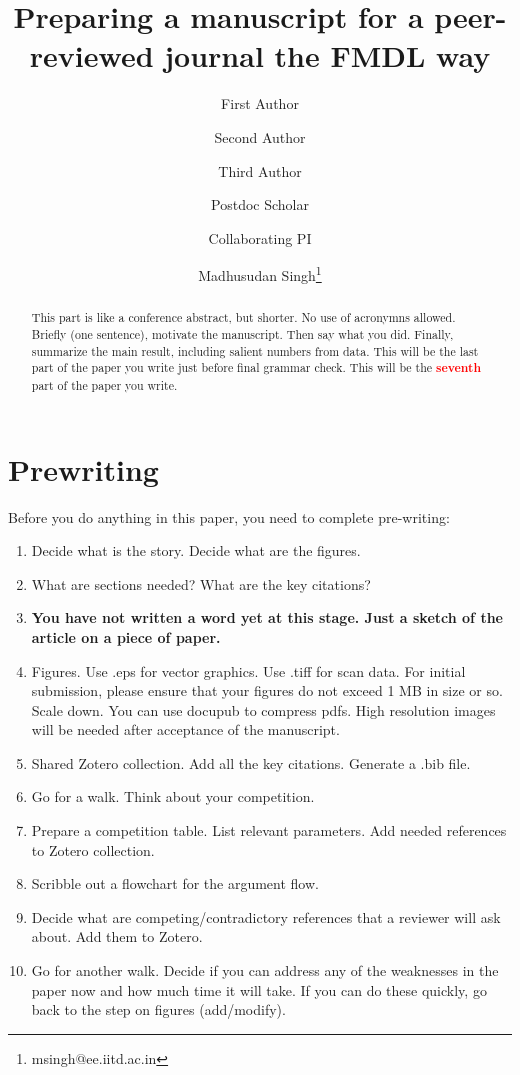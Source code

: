\documentclass[12pt,twocolumn]{article}
\title{Preparing a manuscript for a peer-reviewed journal the FMDL way}
\author[1]{\small First Author} %
\author[2]{\small Second Author}  %
\author[1]{\small Third Author}  %
\author[1]{\small Postdoc Scholar}  %
\author[2]{\small Collaborating PI}  %
\author[1]{\small Madhusudan Singh\thanks{msingh@ee.iitd.ac.in}}  %
\affil[1]{\footnotesize Functional Materials \& Devices Laboratory, Department of Electrical Engineering, IIT Delhi, New Delhi, NCT, India, 110 016.} %
\affil[2]{\footnotesize Department of Chemistry, IIT Delhi, New Delhi, NCT, India, 110 016.} %
\date{} %
\begin{document}
\maketitle %

\begin{abstract}
This part is like a conference abstract, but shorter. No use of acronymns allowed. Briefly (one sentence), motivate the manuscript. Then say what you did. Finally, summarize the main result, including salient numbers from data. This will be the last part of the paper you write just before final grammar check. This will be the \textbf{\Huge \textcolor{red}{seventh}} part of the paper you write.
\end{abstract}

\linenumbers %


\section{Prewriting}

Before you do anything in this paper, you need to complete pre-writing:

\begin{enumerate}
\item Decide what is the story. Decide what are the figures.
\item What are sections needed? What are the key citations?
\item \textbf{You have not written a word yet at this stage. Just a sketch of the article on a piece of paper.}
\item Figures. Use .eps for vector graphics. Use .tiff for scan data. For initial submission, please ensure that your figures do not exceed 1 MB in size or so. Scale down. You can use docupub to compress pdfs. High resolution images will be needed after acceptance of the manuscript.
\item Shared Zotero collection. Add all the key citations. Generate a .bib file.
\item Go for a walk. Think about your competition.
\item Prepare a competition table. List relevant parameters. Add needed references to Zotero collection.
\item Scribble out a flowchart for the argument flow.
\item Decide what are competing/contradictory references that a reviewer will ask about. Add them to Zotero.
\item Go for another walk. Decide if you can address any of the weaknesses in the paper now and how much time it will take. If you can do these quickly, go back to the step on figures (add/modify).
\end{enumerate}
\end{document}
